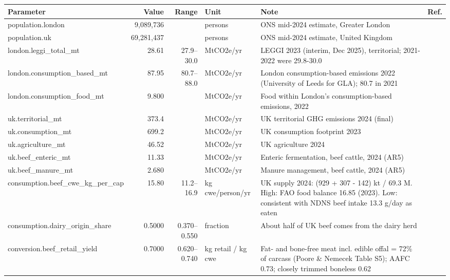 \begin{longtable}{>{\raggedright\arraybackslash}p{4.2cm}rr>{\raggedright\arraybackslash}p{2.2cm}>{\raggedright\arraybackslash}p{5.4cm}l}
\toprule
Parameter & Value & Range & Unit & Note & Ref. \\
\midrule
\endhead
population.london & 9{,}089{,}736 &  & persons & ONS mid-2024 estimate, Greater London & \cite{ons2025pop} \\
population.uk & 69{,}281{,}437 &  & persons & ONS mid-2024 estimate, United Kingdom & \cite{ons2025pop} \\
london.leggi\_total\_mt & 28.61 & 27.9--30.0 & MtCO2e/yr & LEGGI 2023 (interim, Dec 2025), territorial; 2021-2022 were 29.8-30.0 & \cite{leggi2025} \\
london.consumption\_based\_mt & 87.95 & 80.7--88.0 & MtCO2e/yr & London consumption-based emissions 2022 (University of Leeds for GLA); 80.7 in 2021 & \cite{gla2024cbe} \\
london.consumption\_food\_mt & 9.800 &  & MtCO2e/yr & Food within London's consumption-based emissions, 2022 & \cite{gla2024cbe} \\
uk.territorial\_mt & 373.4 &  & MtCO2e/yr & UK territorial GHG emissions 2024 (final) & \cite{desnz2026ghg} \\
uk.consumption\_mt & 699.2 &  & MtCO2e/yr & UK consumption footprint 2023 & \cite{defra2026footprint} \\
uk.agriculture\_mt & 46.52 &  & MtCO2e/yr & UK agriculture 2024 & \cite{desnz2026ghg} \\
uk.beef\_enteric\_mt & 11.33 &  & MtCO2e/yr & Enteric fermentation, beef cattle, 2024 (AR5) & \cite{desnz2026ghg} \\
uk.beef\_manure\_mt & 2.680 &  & MtCO2e/yr & Manure management, beef cattle, 2024 (AR5) & \cite{desnz2026ghg} \\
consumption.beef\_cwe\_kg\_per\_cap & 15.80 & 11.2--16.9 & kg cwe/person/yr & UK supply 2024: (929 + 307 - 142) kt / 69.3 M. High: FAO food balance 16.85 (2023). Low: consistent with NDNS beef intake 13.3 g/day as eaten & \cite{defra2025auk} \\
consumption.dairy\_origin\_share & 0.5000 & 0.370--0.550 & fraction & About half of UK beef comes from the dairy herd & \cite{ciel2020} \\
conversion.beef\_retail\_yield & 0.7000 & 0.620--0.740 & kg retail / kg cwe & Fat- and bone-free meat incl. edible offal = 72\% of carcass (Poore \& Nemecek Table S5); AAFC 0.73; closely trimmed boneless 0.62 & \cite{poore2018} \\

\end{longtable}
